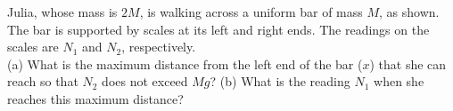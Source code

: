 Julia, whose mass is $2M$, is walking across a uniform bar of mass $M$,
as shown. The bar is supported by scales at its left and right
ends. The readings on the scales are $N_1$ and $N_2$,
respectively.\\
%
(a) What is the maximum distance from the left end of the bar ($x$)
that she can reach so that $N_2$ does not exceed $Mg$?\answercheck\hwendpart
%
(b) What is the reading $N_1$ when she reaches this maximum distance?\answercheck
